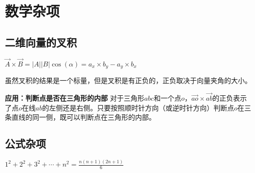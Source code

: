 \section{数学杂项}
\subsection{二维向量的叉积}
$\vec{A}\times\vec{B} = |A||B|\cos(\alpha)= a_x\times b_y-a_y\times b_x$

虽然叉积的结果是一个标量，但是叉积是有正负的，正负取决于向量夹角的大小。

\textbf{应用：判断点是否在三角形的内部}
对于三角形$abc$和一个点$o$，$\vec{ao}\times\vec{ab}$的正负表示了点$o$在线$ab$的左侧还是右侧。只要按照顺时针方向（或逆时针方向）判断点$o$在三条直线的同一侧，既可以判断点在三角形的内部。




\subsection{公式杂项}

$1^2+2^2+3^2+\cdots+n^2=\frac{n(n+1)(2n+1)}{6}$

